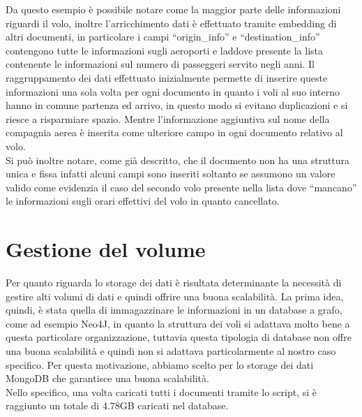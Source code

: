 \documentclass[12pt]{article}
\begin{document}
\noindent Da questo esempio è possibile notare come la maggior parte delle informazioni riguardi il volo, inoltre l'arricchimento dati è effettuato tramite embedding di altri documenti, in particolare i campi ``origin\_info'' e ``destination\_info'' contengono tutte le informazioni sugli aeroporti e laddove presente la lista contenente le informazioni sul numero di passeggeri servito negli anni. Il raggruppamento dei dati effettuato inizialmente permette di inserire queste informazioni una sola volta per ogni documento in quanto i voli al suo interno hanno in comune partenza ed arrivo, in questo modo si evitano duplicazioni e si riesce a risparmiare spazio. Mentre l'informazione aggiuntiva sul nome della compagnia aerea è inserita come ulteriore campo in ogni documento relativo al volo.\\
Si può inoltre notare, come già descritto, che il documento non ha una struttura unica e fissa infatti alcuni campi sono inseriti soltanto se assumono un valore valido come evidenzia il caso del secondo volo presente nella lista dove ``mancano'' le informazioni sugli orari effettivi del volo in quanto cancellato.

\section{Gestione del volume}
Per quanto riguarda lo storage dei dati è risultata determinante la necessità di gestire alti volumi di dati e quindi offrire una buona scalabilità. La prima idea, quindi, è stata quella di immagazzinare le informazioni in un database a grafo, come ad esempio Neo4J, in quanto la struttura dei voli si adattava molto bene a questa particolare organizzazione, tuttavia questa tipologia di database non offre una buona scalabilità e quindi non si adattava particolarmente al nostro caso specifico.
Per questa motivazione, abbiamo scelto per lo storage dei dati MongoDB che garantisce una buona scalabilità.\\
Nello specifico, una volta caricati tutti i documenti tramite lo script, si è raggiunto un totale di 4.78GB caricati nel database.
\end{document}
